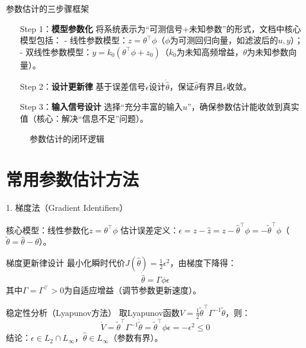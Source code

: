 \documentclass{beamer}
\begin{document}
\begin{frame}{参数估计的三步骤框架}
  \begin{enumerate}
    \item[Step 1：\textbf{模型参数化}]
      将系统表示为“可测信号+未知参数”的形式，文档中核心模型包括：
      - 线性参数模型：$z=\theta^\top\phi$（$\phi$为可测回归向量，如滤波后的$u,y$）；
      - 双线性参数模型：$y=k_0(\theta^\top\phi+z_0)$（$k_0$为未知高频增益，$\theta$为未知参数向量）。

    \item[Step 2：\textbf{设计更新律}]
      基于误差信号$\epsilon$设计$\dot{\hat{\theta}}$，保证$\hat{\theta}$有界且$\epsilon$收敛。

    \item[Step 3：\textbf{输入信号设计}]
      选择“充分丰富的输入$u$”，确保参数估计能收敛到真实值（核心：解决“信息不足”问题）。
  \end{enumerate}

  \vspace{0.3cm}
  \begin{figure}
    \caption{参数估计的闭环逻辑}
  \end{figure}
\end{frame}

\section{常用参数估计方法}
\begin{frame}{1. 梯度法（Gradient Identifiers）}
  \begin{block}{核心模型：线性参数化$z=\theta^\top\phi$}
    估计误差定义：$\epsilon=z-\hat{z}=z-\hat{\theta}^\top\phi=-\tilde{\theta}^\top\phi$（$\tilde{\theta}=\hat{\theta}-\theta$）。
  \end{block}

  \begin{block}{梯度更新律设计}
    最小化瞬时代价$J(\hat{\theta})=\frac{1}{2}\epsilon^2$，由梯度下降得：
    \[
    \dot{\hat{\theta}}=\Gamma\phi\epsilon
    \]
    其中$\Gamma=\Gamma^\top>0$为自适应增益（调节参数更新速度）。
  \end{block}

  \begin{block}{稳定性分析（Lyapunov方法）}
    取Lyapunov函数$V=\frac{1}{2}\tilde{\theta}^\top\Gamma^{-1}\tilde{\theta}$，则：
    \[
    \dot{V}=\tilde{\theta}^\top\Gamma^{-1}\dot{\tilde{\theta}}=\tilde{\theta}^\top\phi\epsilon=-\epsilon^2\leq0
    \]
    结论：$\epsilon\in L_2\cap L_\infty$，$\hat{\theta}\in L_\infty$（参数有界）。
  \end{block}
\end{frame}
\end{document}
